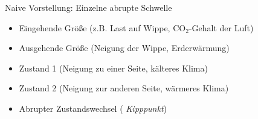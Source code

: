 \documentclass{beamer}
\newcommand{\COO}{$\mathrm{CO}_2$}%
\begin{document}
\begin{frame}
  Naive Vorstellung: Einzelne abrupte Schwelle
  \begin{itemize}
    \item<2->  Eingehende Größe (z.B. Last auf Wippe,
      \COO-Gehalt der Luft)
    \item<3->  Ausgehende Größe (Neigung der Wippe,
      Erderwärmung)
    \item<4->  Zustand 1 (Neigung zu einer Seite,
      kälteres Klima)
    \item<5->  Zustand 2 (Neigung zur anderen Seite,
      wärmeres Klima)
    \item<6->  Abrupter Zustandswechsel ({\em
      Kipppunkt})
  \end{itemize}
\end{frame}
\end{document}
